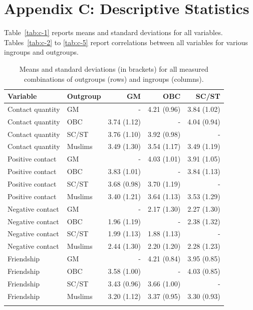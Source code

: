 \documentclass[12pt, a4paper]{article}
\begin{document}
\newpage

\section{Appendix C: Descriptive Statistics}

Table~\ref{tab:c-1} reports means and standard deviations for all variables. Tables~\ref{tab:c-2} to \ref{tab:c-5} report correlations between all variables for various ingroups and outgroups.

\begin{table}[!hp]
\centering
{}
\caption{Means and standard deviations (in brackets) for all measured combinations of outgroups (rows) and ingroups (columns).}
\small	
\begin{tabular}{llrrr} \toprule
Variable & Outgroup & GM & OBC & SC/ST \\ \midrule \addlinespace
  Contact quantity & GM & - & 4.21 (0.96) & 3.84 (1.02) \\ 
  Contact quantity & OBC & 3.74 (1.12) & - & 4.04 (0.94) \\ 
  Contact quantity & SC/ST & 3.76 (1.10) & 3.92 (0.98) & - \\ 
  Contact quantity & Muslims & 3.49 (1.30) & 3.54 (1.17) & 3.49 (1.19) \\ \addlinespace
  Positive contact & GM & - & 4.03 (1.01) & 3.91 (1.05) \\ 
  Positive contact & OBC & 3.83 (1.01) & - & 3.84 (1.13) \\ 
  Positive contact & SC/ST & 3.68 (0.98) & 3.70 (1.19) & - \\ 
  Positive contact & Muslims & 3.40 (1.21) & 3.64 (1.13) & 3.53 (1.29) \\ \addlinespace
  Negative contact & GM & - & 2.17 (1.30) & 2.27 (1.30) \\ 
  Negative contact & OBC & 1.96 (1.19) & - & 2.38 (1.32) \\ 
  Negative contact & SC/ST & 1.99 (1.13) & 1.88 (1.13) & - \\ 
  Negative contact & Muslims & 2.44 (1.30) & 2.20 (1.20) & 2.28 (1.23) \\ \addlinespace
  Friendship & GM & - & 4.21 (0.84) & 3.95 (0.85) \\ 
  Friendship & OBC & 3.58 (1.00) & - & 4.03 (0.85) \\ 
  Friendship & SC/ST & 3.43 (0.96) & 3.66 (1.00) & - \\ 
  Friendship & Muslims & 3.20 (1.12) & 3.37 (0.95) & 3.30 (0.93) \\ \addlinespace

\end{tabular}
\end{table}
\end{document}
